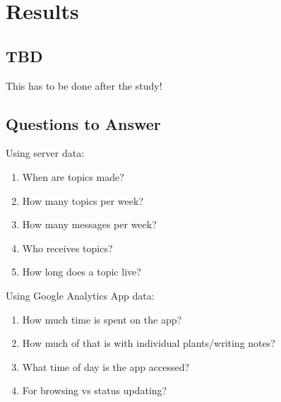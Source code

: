\chapter{Results}
\section{TBD}
  This has to be done after the study!

\section{Questions to Answer}

  Using server data:
  \begin{enumerate}
    \item When are topics made?
    \item How many topics per week?
    \item How many messages per week?
    \item Who receives topics?
    \item How long does a topic live?
  \end{enumerate}

  Using Google Analytics App data:
  \begin{enumerate}
    \item How much time is spent on the app?
    \item How much of that is with individual plants/writing notes?
    \item What time of day is the app accessed?
    \item For browsing vs status updating?
  \end{enumerate}

